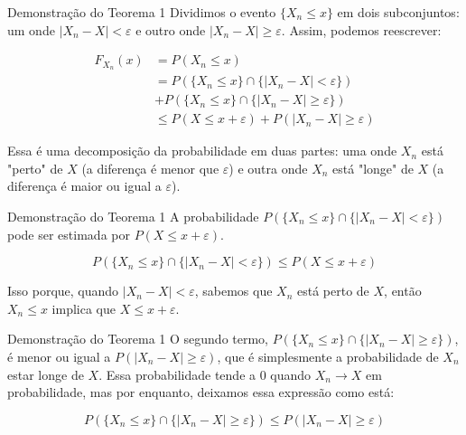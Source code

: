 \documentclass[12pt]{beamer}
\begin{document}
\begin{frame}{}
	\begin{block}{Demonstração do Teorema 1}
	Dividimos o evento \( \{X_n \leq x\} \) em dois subconjuntos: um onde \( |X_n - X| < \varepsilon \) e outro onde \( |X_n - X| \geq \varepsilon \). Assim, podemos reescrever:
	
	\begin{align*}
		F_{X_n}(x) &= P(X_n \leq x)\\ 
		&= P(\{X_n \leq x\} \cap \{|X_n - X| < \varepsilon\})\\ 
		&+ P(\{X_n \leq x\} \cap \{|X_n - X| \geq \varepsilon\})\\
		&\leq P(X \leq x + \varepsilon) + P(|X_n - X| \geq \varepsilon)
	\end{align*}
	
	Essa é uma decomposição da probabilidade em duas partes: uma onde \( X_n \) está "perto" de \( X \) (a diferença é menor que \( \varepsilon \)) e outra onde \( X_n \) está "longe" de \( X \) (a diferença é maior ou igual a \( \varepsilon \)).	
	\end{block}
\end{frame}


\begin{frame}{}
	\begin{block}{Demonstração do Teorema 1}
	A probabilidade \( P(\{X_n \leq x\} \cap \{|X_n - X| < \varepsilon\}) \) pode ser estimada por \( P(X \leq x + \varepsilon) \).
	
	\[
	P(\{X_n \leq x\} \cap \{|X_n - X| < \varepsilon\}) \leq P(X \leq x + \varepsilon)
	\]
	
	Isso porque, quando \( |X_n - X| < \varepsilon \), sabemos que \( X_n \) está perto de \( X \), então \( X_n \leq x \) implica que \( X \leq x + \varepsilon \).	
	\end{block}
\end{frame}


\begin{frame}{}
	\begin{block}{Demonstração do Teorema 1}
	O segundo termo, \( P(\{X_n \leq x\} \cap \{|X_n - X| \geq \varepsilon\}) \), é menor ou igual a \( P(|X_n - X| \geq \varepsilon) \), que é simplesmente a probabilidade de $X_{n}$ estar longe de $X.$ Essa probabilidade tende a 0 quando \( X_n \to X \) em probabilidade, mas por enquanto, deixamos essa expressão como está:
	
	\[
	P(\{X_n \leq x\} \cap \{|X_n - X| \geq \varepsilon\}) \leq P(|X_n - X| \geq \varepsilon)
	\]	
	\end{block}
\end{frame}
\end{document}

